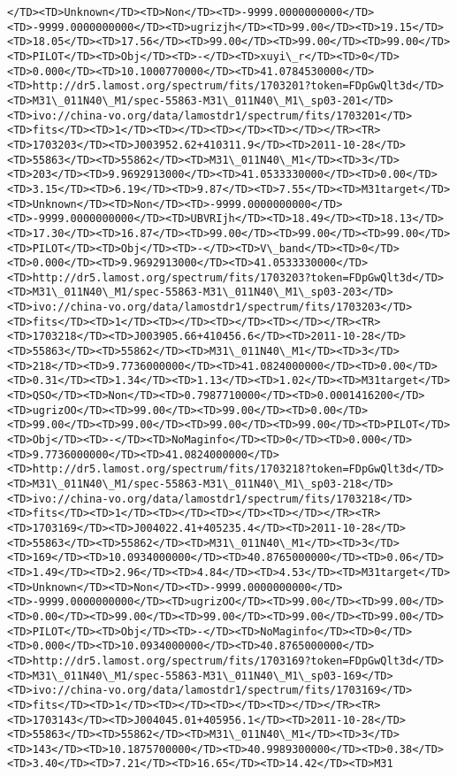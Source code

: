 \documentclass[11pt]{article}
\begin{document}
\begin{Verbatim}[commandchars=\\\{\}]
</TD><TD>Unknown</TD><TD>Non</TD><TD>-9999.0000000000</TD><TD>-9999.0000000000</TD><TD>ugrizjh</TD><TD>99.00</TD><TD>19.15</TD><TD>18.05</TD><TD>17.56</TD><TD>99.00</TD><TD>99.00</TD><TD>99.00</TD><TD>PILOT</TD><TD>Obj</TD><TD>-</TD><TD>xuyi\_r</TD><TD>0</TD><TD>0.000</TD><TD>10.1000770000</TD><TD>41.0784530000</TD><TD>http://dr5.lamost.org/spectrum/fits/1703201?token=FDpGwQlt3d</TD><TD>M31\_011N40\_M1/spec-55863-M31\_011N40\_M1\_sp03-201</TD><TD>ivo://china-vo.org/data/lamostdr1/spectrum/fits/1703201</TD><TD>fits</TD><TD>1</TD><TD></TD><TD></TD><TD></TD></TR><TR><TD>1703203</TD><TD>J003952.62+410311.9</TD><TD>2011-10-28</TD><TD>55863</TD><TD>55862</TD><TD>M31\_011N40\_M1</TD><TD>3</TD><TD>203</TD><TD>9.9692913000</TD><TD>41.0533330000</TD><TD>0.00</TD><TD>3.15</TD><TD>6.19</TD><TD>9.87</TD><TD>7.55</TD><TD>M31target</TD><TD>Unknown</TD><TD>Non</TD><TD>-9999.0000000000</TD><TD>-9999.0000000000</TD><TD>UBVRIjh</TD><TD>18.49</TD><TD>18.13</TD><TD>17.30</TD><TD>16.87</TD><TD>99.00</TD><TD>99.00</TD><TD>99.00</TD><TD>PILOT</TD><TD>Obj</TD><TD>-</TD><TD>V\_band</TD><TD>0</TD><TD>0.000</TD><TD>9.9692913000</TD><TD>41.0533330000</TD><TD>http://dr5.lamost.org/spectrum/fits/1703203?token=FDpGwQlt3d</TD><TD>M31\_011N40\_M1/spec-55863-M31\_011N40\_M1\_sp03-203</TD><TD>ivo://china-vo.org/data/lamostdr1/spectrum/fits/1703203</TD><TD>fits</TD><TD>1</TD><TD></TD><TD></TD><TD></TD></TR><TR><TD>1703218</TD><TD>J003905.66+410456.6</TD><TD>2011-10-28</TD><TD>55863</TD><TD>55862</TD><TD>M31\_011N40\_M1</TD><TD>3</TD><TD>218</TD><TD>9.7736000000</TD><TD>41.0824000000</TD><TD>0.00</TD><TD>0.31</TD><TD>1.34</TD><TD>1.13</TD><TD>1.02</TD><TD>M31target</TD><TD>QSO</TD><TD>Non</TD><TD>0.7987710000</TD><TD>0.0001416200</TD><TD>ugrizOO</TD><TD>99.00</TD><TD>99.00</TD><TD>0.00</TD><TD>99.00</TD><TD>99.00</TD><TD>99.00</TD><TD>99.00</TD><TD>PILOT</TD><TD>Obj</TD><TD>-</TD><TD>NoMaginfo</TD><TD>0</TD><TD>0.000</TD><TD>9.7736000000</TD><TD>41.0824000000</TD><TD>http://dr5.lamost.org/spectrum/fits/1703218?token=FDpGwQlt3d</TD><TD>M31\_011N40\_M1/spec-55863-M31\_011N40\_M1\_sp03-218</TD><TD>ivo://china-vo.org/data/lamostdr1/spectrum/fits/1703218</TD><TD>fits</TD><TD>1</TD><TD></TD><TD></TD><TD></TD></TR><TR><TD>1703169</TD><TD>J004022.41+405235.4</TD><TD>2011-10-28</TD><TD>55863</TD><TD>55862</TD><TD>M31\_011N40\_M1</TD><TD>3</TD><TD>169</TD><TD>10.0934000000</TD><TD>40.8765000000</TD><TD>0.06</TD><TD>1.49</TD><TD>2.96</TD><TD>4.84</TD><TD>4.53</TD><TD>M31target</TD><TD>Unknown</TD><TD>Non</TD><TD>-9999.0000000000</TD><TD>-9999.0000000000</TD><TD>ugrizOO</TD><TD>99.00</TD><TD>99.00</TD><TD>0.00</TD><TD>99.00</TD><TD>99.00</TD><TD>99.00</TD><TD>99.00</TD><TD>PILOT</TD><TD>Obj</TD><TD>-</TD><TD>NoMaginfo</TD><TD>0</TD><TD>0.000</TD><TD>10.0934000000</TD><TD>40.8765000000</TD><TD>http://dr5.lamost.org/spectrum/fits/1703169?token=FDpGwQlt3d</TD><TD>M31\_011N40\_M1/spec-55863-M31\_011N40\_M1\_sp03-169</TD><TD>ivo://china-vo.org/data/lamostdr1/spectrum/fits/1703169</TD><TD>fits</TD><TD>1</TD><TD></TD><TD></TD><TD></TD></TR><TR><TD>1703143</TD><TD>J004045.01+405956.1</TD><TD>2011-10-28</TD><TD>55863</TD><TD>55862</TD><TD>M31\_011N40\_M1</TD><TD>3</TD><TD>143</TD><TD>10.1875700000</TD><TD>40.9989300000</TD><TD>0.38</TD><TD>3.40</TD><TD>7.21</TD><TD>16.65</TD><TD>14.42</TD><TD>M31
\end{Verbatim}
\end{document}

